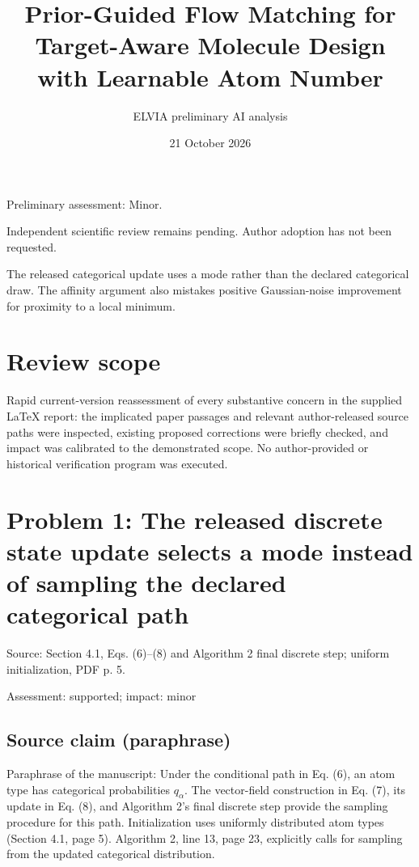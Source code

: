 \documentclass[11pt]{article}
\begin{document}
\title{Prior-Guided Flow Matching for Target-Aware Molecule Design with Learnable Atom Number}

\author{ELVIA preliminary AI analysis}\date{21 October 2026}\maketitle

Preliminary assessment: Minor.\par

Independent scientific review remains pending. Author adoption has not been requested.

The released categorical update uses a mode rather than the declared categorical draw. The affinity argument also mistakes positive Gaussian-noise improvement for proximity to a local minimum.

\section*{Review scope}

Rapid current-version reassessment of every substantive concern in the supplied LaTeX report: the implicated paper passages and relevant author-released source paths were inspected, existing proposed corrections were briefly checked, and impact was calibrated to the demonstrated scope. No author-provided or historical verification program was executed.

\section*{Problem 1: The released discrete state update selects a mode instead of sampling the declared categorical path}

Source: Section 4.1, Eqs. (6)–(8) and Algorithm 2 final discrete step; uniform initialization, PDF p. 5.

Assessment: supported; impact: minor

\subsection*{Source claim (paraphrase)}

Paraphrase of the manuscript: Under the conditional path in Eq. (6), an atom type has categorical probabilities \(q_\alpha\). The vector-field construction in Eq. (7), its update in Eq. (8), and Algorithm 2’s final discrete step provide the sampling procedure for this path. Initialization uses uniformly distributed atom types (Section 4.1, page 5). Algorithm 2, line 13, page 23, explicitly calls for sampling from the updated categorical distribution.
\end{document}
